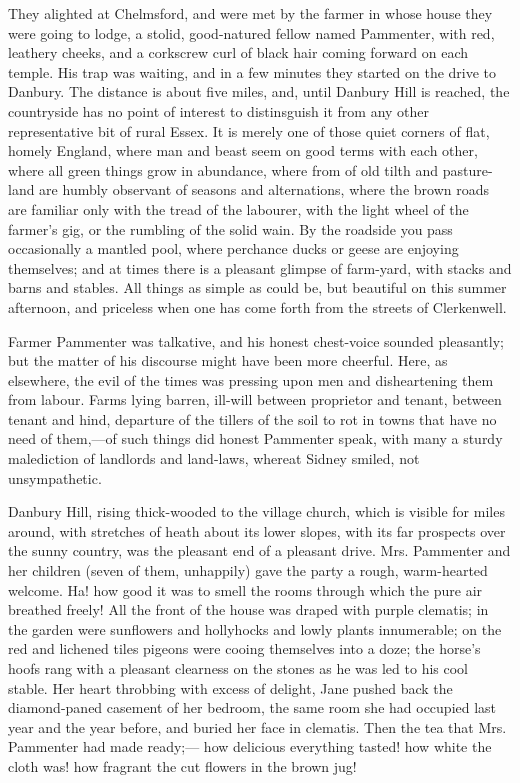 {}They alighted at Chelmsford, and were met by the farmer in whose house
they were going to lodge, a stolid, good-natured fellow named Pammenter,
with red, leathery cheeks, and a corkscrew curl of black hair coming
forward on each temple. His trap was waiting, and in a few minutes they
started on the drive to Danbury. The distance is about five miles, and,
until Danbury Hill is reached, the countryside has no point of interest
to distinsguish it from any other representative bit of rural Essex. It
is merely one of those quiet corners of flat, homely England, where man
and beast seem on good terms with each other, where all green things
grow in abundance, where from of old tilth and pasture-land are humbly
observant of seasons and alternations, where the brown roads are
familiar only with the tread of the labourer, with the light wheel of
the farmer's gig, or the rumbling of the solid wain. By the roadside you
pass occasionally a mantled pool, where perchance ducks or geese are
enjoying themselves; and at times {}there is a pleasant glimpse of
farm-yard, with stacks and barns and stables. All things as simple as
could be, but beautiful on this summer afternoon, and priceless when one
has come forth from the streets of Clerkenwell.

Farmer Pammenter was talkative, and his honest chest-voice sounded
pleasantly; but the matter of his discourse might have been more
cheerful. Here, as elsewhere, the evil of the times was pressing upon
men and disheartening them from labour. Farms lying barren, ill-will
between proprietor and tenant, between tenant and hind, departure of the
tillers of the soil to rot in towns that have no need of them,---of such
things did honest Pammenter speak, with many a sturdy malediction of
landlords and land-laws, whereat Sidney smiled, not unsympathetic.

Danbury Hill, rising thick-wooded to the village church, which is
visible for miles around, with stretches of heath about its lower
slopes, with its far prospects over the sunny country, was the pleasant
end of a pleasant drive. Mrs. Pammenter and her {}children (seven of
them, unhappily) gave the party a rough, warm-hearted welcome. Ha! how
good it was to smell the rooms through which the pure air breathed
freely! All the front of the house was draped with purple clematis; in
the garden were sunflowers and hollyhocks and lowly plants innumerable;
on the red and lichened tiles pigeons were cooing themselves into a
doze; the horse's hoofs rang with a pleasant clearness on the stones as
he was led to his cool stable. Her heart throbbing with excess of
delight, Jane pushed back the diamond-paned casement of her bedroom, the
same room she had occupied last year and the year before, and buried her
face in clematis. Then the tea that Mrs. Pammenter had made ready;---
how delicious everything tasted! how white the cloth was! how fragrant
the cut flowers in the brown jug!

